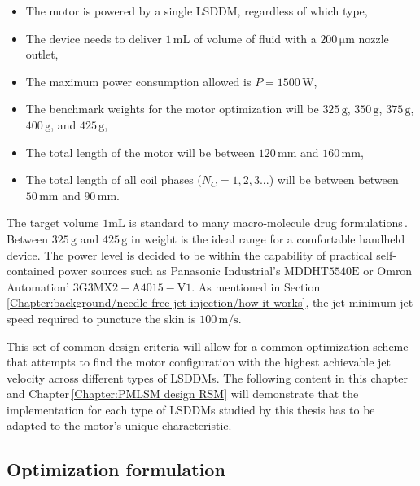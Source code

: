         
        \begin{itemize}
            \item The motor is powered by a single \acs{LSDDM}, regardless of which type,
            \item The device needs to deliver $1\,\mathrm{mL}$ of volume of fluid with a $200\,\mathrm{\mu m}$ nozzle outlet,
            \item The maximum power consumption allowed is $P=1500\,\mathrm{W}$,
            \item The benchmark weights for the motor optimization will be $325\,\mathrm{g}$, $350\,\mathrm{g}$, $375\,\mathrm{g}$, $400\,\mathrm{g}$, and $425\,\mathrm{g}$,
            \item The total length of the motor will be between $120\,\mathrm{mm}$ and $160\,\mathrm{mm}$,
            \item The total length of all coil phases ($N_C=1,2,3...$) will be between between $50\,\mathrm{mm}$ and $90\,\mathrm{mm}$.
        \end{itemize}
        
        
        The target volume $1\mathrm{mL}$ is standard to many macro-molecule drug formulations\,\cite{Hogan2015a}. Between $325\,\mathrm{g}$ and $425\,\mathrm{g}$ in weight is the ideal range for a comfortable handheld device. The power level is decided to be within the capability of practical self-contained power sources such as Panasonic Industrial's $\mathrm{	MDDHT5540E}$ or Omron Automation' $\mathrm{3G3MX2-A4015-V1}$. As mentioned in Section\,\ref{Chapter:background/needle-free jet injection/how it works}, the jet minimum jet speed required to puncture the skin is $100\,\mathrm{m/s}$. 
        
        
        This set of common design criteria will allow for a common optimization scheme that attempts to find the motor configuration with the highest achievable jet velocity across different types of \acsp{LSDDM}. The following content in this chapter and Chapter\,\ref{Chapter:PMLSM design RSM} will demonstrate that the implementation for each type of \acsp{LSDDM} studied by this thesis has to be adapted to the motor's unique characteristic.
        

    \subsection{Optimization formulation}       \label{Chapter:PMLSM design HM/design optimization/optimization formulation}
    
